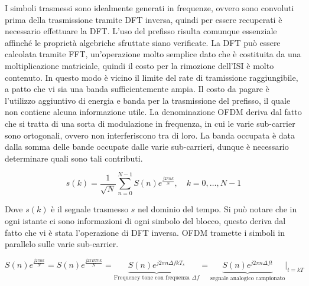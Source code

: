 


I simboli trasmessi sono idealmente generati in frequenze, ovvero sono convoluti prima della trasmissione tramite DFT inversa, quindi per essere recuperati è necessario effettuare la DFT. L'uso del prefisso risulta comunque essenziale affinché le proprietà algebriche sfruttate siano verificate. 
La DFT può essere calcolata tramite FFT, un'operazione molto semplice dato che è costituita da una moltiplicazione matriciale, quindi il costo per la rimozione dell'ISI è molto contenuto. In questo modo è vicino il limite del rate di tramissione raggiungibile, a patto che vi sia una banda sufficientemente ampia.
Il costo da pagare è l'utilizzo aggiuntivo di energia e banda per la trasmissione del prefisso, il quale non contiene alcuna informazione utile.
La denominazione OFDM deriva dal fatto che si tratta di una sorta di modulazione in frequenza, in cui le varie sub-carrier sono ortogonali, ovvero non interferiscono tra di loro. La banda occupata è data dalla somma delle bande occupate dalle varie sub-carrieri, dunque è necessario determinare quali sono tali contributi.

\[
    s(k) = \frac{1}{\sqrt{N}} \sum_{n=0}^{N-1} S(n) e^{\frac{j2\pi nk}{N}}, \quad k = 0, \ldots, N-1
\]

Dove $s(k)$ è il segnale trasmesso $s$ nel dominio del tempo. Si può notare che in ogni istante ci sono informazioni di ogni simbolo del blocco, questo deriva dal fatto che vi è stata l'operazione di DFT inversa. OFDM tramette i simboli in parallelo sulle varie sub-carrier. 


\[
    S(n) e^{\frac{j2\pi nk}{N}} = S(n) e^{\frac{j2\pi BTnk}{N}} = \underbrace{S(n) e^{j2\pi n\Delta f k T_s}}_{\text{Frequency tone con frequenza $\Delta f$}} = \underbrace{S(n) e^{j 2 \pi n \Delta f t}}_{\text{segnale analogico campionato}} \bigg|_{t=kT}
\]


